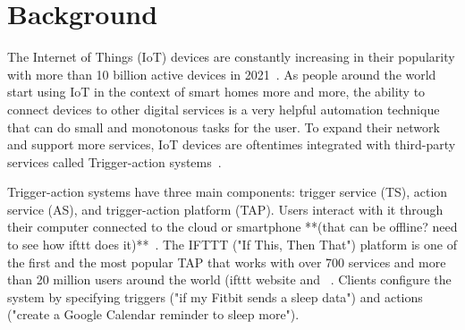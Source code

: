 \section{Background}
\label{sec:background}

The Internet of Things (IoT) devices are constantly increasing in their popularity with more than 10 billion
active devices in 2021~\cite{DBLP:webpage/Bojan/IoTstats}. As people around the world start using IoT
in the context of smart homes more and more, the ability to connect devices to other digital services is a
very helpful automation technique that can do small and monotonous tasks for the user. To expand their
network and support more services, IoT devices are oftentimes integrated with third-party services called
Trigger-action systems~\cite{DBLP:journals/access/XuZZCDG19, DBLP:conf/chi/UrHBLMPSL16}.

Trigger-action systems have three main components: trigger service (TS), action service (AS), and
trigger-action platform (TAP). Users interact with it through their computer connected to the cloud or
smartphone **(that can be offline? need to see how ifttt does it)**~\cite{DBLP:conf/sp/ChenCWSCF21}.
The IFTTT ("If This, Then That") platform is one of the first and the most popular TAP that works with
over 700 services and more than 20 million users around the world (ifttt website and ~\cite{DBLP:conf/spChenCWSCF21}. Clients configure the system by specifying triggers ("if my Fitbit sends a sleep data")
and actions ("create a Google Calendar reminder to sleep more"). 

